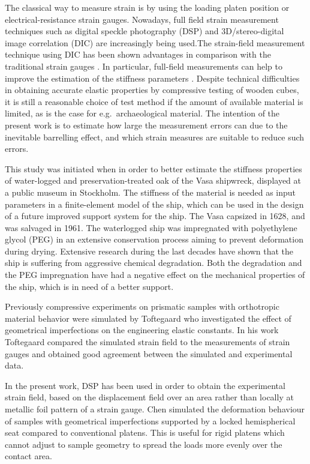 \documentclass[3p]{elsarticle}
\begin{document}
The classical way to measure strain is by using the loading platen position or electrical-resistance strain gauges. Nowadays, full field strain measurement techniques such
as digital speckle photography (DSP) \cite{synnergren1999stereoscopic} and
3D/stereo-digital image correlation (DIC) \cite{majano2012test} are 
increasingly being used.The strain-field measurement technique using
DIC has been shown advantages in comparison with the traditional strain gauges
\cite{huang2010optical,xavier2012stereovision}. In particular, full-field measurements can help to improve the estimation of the stiffness parameters \cite{dahl2009planar,
majano2012test, ozyhar2013moisture}. 
Despite technical difficulties in obtaining accurate elastic properties by compressive testing of wooden cubes, it is still a reasonable 
choice of test method if the amount of available material is limited, as is the case for e.g.\ archaeological material. The intention of the present work is to estimate how large the measurement errors can due to the inevitable barrelling effect, and which strain measures are suitable to reduce such errors.  \par 

This study was initiated when in order to better estimate the stiffness properties of water-logged and preservation-treated  oak of the Vasa shipwreck, displayed at a public museum in Stockholm. The stiffness of the material is needed as input parameters in a finite-element model of the ship, which can be used in the design of a future improved support system for the ship. The Vasa capsized in 1628, and was salvaged in 1961. 
The waterlogged ship was impregnated with polyethylene glycol (PEG) in an extensive conservation process aiming to prevent deformation during drying. 
Extensive research during the last decades have shown that the ship is suffering
from aggressive chemical degradation. Both the degradation \cite{bjurhager2012state}
and the PEG impregnation \cite{ljungdahl2007transverse} have had a negative effect on the mechanical properties of the ship, which is in need of a better support. \par
Previously compressive experiments on prismatic samples with orthotropic
material behavior were simulated by Toftegaard \cite{Toftegaard1999849} who investigated the effect of geometrical imperfections on the
engineering elastic constants.
In his work Toftegaard compared the simulated strain field to the measurements
of strain gauges and obtained good agreement between the simulated and experimental
data.\par
In the present work, DSP has been used in order to obtain the experimental
strain field, based on the displacement field over an area rather than locally
at metallic foil pattern of a strain gauge.
Chen \cite{Chen001} simulated the deformation behaviour of samples with geometrical
imperfections supported by a locked hemispherical seat compared to conventional platens. This is useful for rigid platens which cannot adjust to sample geometry to spread the loads more evenly over the contact area.
\par 
\end{document}
